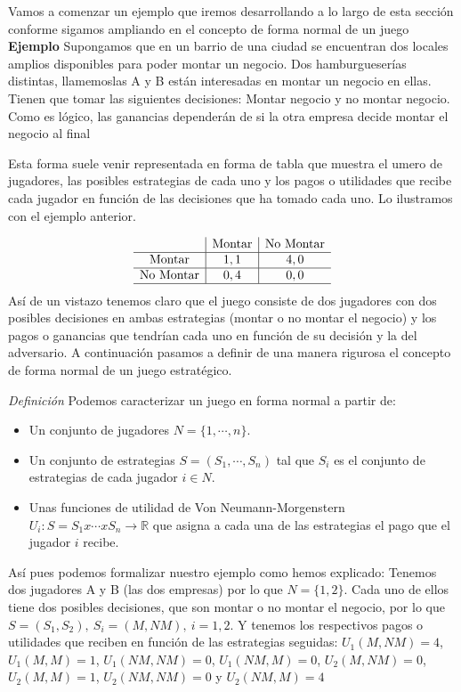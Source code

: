 \documentclass[12pt,a4paper,]{book}
\numberwithin{dummy}{section}
\theoremstyle{ocrenumbox}
\theoremstyle{blacknumex}
\theoremstyle{blacknumbox}
\theoremstyle{ocrenum}
\theoremstyle{ocrenum}
\begin{document}
Vamos a comenzar un ejemplo que iremos desarrollando a lo largo de esta
sección conforme sigamos ampliando en el concepto de forma normal de un
juego \textbf{Ejemplo} Supongamos que en un barrio de una ciudad se
encuentran dos locales amplios disponibles para poder montar un negocio.
Dos hamburgueserías distintas, llamemoslas A y B están interesadas en
montar un negocio en ellas. Tienen que tomar las siguientes decisiones:
Montar negocio y no montar negocio. Como es lógico, las ganancias
dependerán de si la otra empresa decide montar el negocio al final

Esta forma suele venir representada en forma de tabla que muestra el
umero de jugadores, las posibles estrategias de cada uno y los pagos o
utilidades que recibe cada jugador en función de las decisiones que ha
tomado cada uno. Lo ilustramos con el ejemplo anterior.

\[
\begin{array}{c|c|c}
 & \text{Montar} & \text{No Montar} \\
\hline
\text{Montar} & 1,1 & 4,0 \\
\hline
\text{No Montar} & 0,4 & 0,0 \\
\hline
\end{array}
\] Así de un vistazo tenemos claro que el juego consiste de dos
jugadores con dos posibles decisiones en ambas estrategias (montar o no
montar el negocio) y los pagos o ganancias que tendrían cada uno en
función de su decisión y la del adversario. A continuación pasamos a
definir de una manera rigurosa el concepto de forma normal de un juego
estratégico.

\emph{Definición} Podemos caracterizar un juego en forma normal a partir
de:

\begin{itemize}
\item
  Un conjunto de jugadores \(N=\{1,\cdots,n\}\).
\item
  Un conjunto de estrategias \(S=(S_1,\cdots,S_n)\) tal que \(S_i\) es
  el conjunto de estrategias de cada jugador \(i \in N\).
\item
  Unas funciones de utilidad de Von Neumann-Morgenstern
  \(U_i:S=S_1x\cdots xS_n \rightarrow \mathbb{R}\) que asigna a cada una
  de las estrategias el pago que el jugador \(i\) recibe.
\end{itemize}

Así pues podemos formalizar nuestro ejemplo como hemos explicado:
Tenemos dos jugadores A y B (las dos empresas) por lo que \(N=\{1,2\}\).
Cada uno de ellos tiene dos posibles decisiones, que son montar o no
montar el negocio, por lo que \(S=(S_1,S_2), \ S_i=(M,NM), \ i=1,2\). Y
tenemos los respectivos pagos o utilidades que reciben en función de las
estrategias seguidas: \(U_1(M,NM)=4\), \(U_1(M,M)=1\), \(U_1(NM,NM)=0\),
\(U_1(NM,M)=0\), \(U_2(M,NM)=0\), \(U_2(M,M)=1\), \(U_2(NM,NM)=0\) y
\(U_2(NM,M)=4\)
\end{document}
